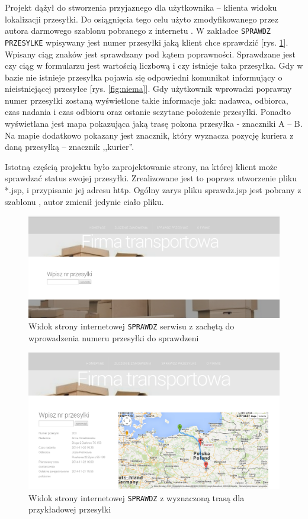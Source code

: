 \documentclass[eng,printmode,oneside]{mgr}
\begin{document}
Projekt dążył do stworzenia przyjaznego dla użytkownika -- klienta widoku
lokalizacji przesyłki. Do osiągnięcia tego celu użyto zmodyfikowanego przez
autora darmowego szablonu pobranego z internetu \cite{szablon}. W zakładce
\texttt{SPRAWDZ PRZESYLKE} wpisywany jest numer przesyłki jaką klient chce
sprawdzić [rys.
\ref{fig:sprawdz}]. Wpisany ciąg znaków jest sprawdzany pod kątem poprawności.
Sprawdzane jest czy ciąg w formularzu jest wartością liczbową i czy istnieje
taka przesyłka. Gdy w bazie nie istnieje przesyłka pojawia się odpowiedni komunikat
informujący o nieistniejącej przesyłce [rys. \ref{fig:niema}]. Gdy użytkownik
wprowadzi poprawny numer przesyłki zostaną wyświetlone takie informacje jak:
nadawca, odbiorca, czas nadania i czas odbioru oraz ostanie sczytane położenie
przesyłki. Ponadto wyświetlana jest mapa pokazująca jaką trasę pokona przesyłka
- znaczniki A -- B. Na mapie dodatkowo pokazany jest znacznik, który wyznacza
pozycję kuriera z daną przesyłką -- znacznik ,,kurier''.

Istotną częścią projektu było zaprojektowanie strony, na której
klient może sprawdzać status swojej przesyłki. Zrealizowane jest to poprzez
utworzenie pliku *.jsp, i przypisanie jej adresu http. Ogólny zarys pliku sprawdz.jsp jest
pobrany z szablonu \cite{szablon}, autor zmienił jedynie ciało pliku. 

\begin{figure}[ht!]
\centering
\includegraphics[width=\textwidth]{sprawdz.png}
\caption{Widok strony internetowej \texttt{SPRAWDZ} serwisu z zachętą do
wprowadzenia numeru przesyłki do sprawdzeni}
\label{fig:sprawdz}
\end{figure}

\begin{figure}[ht!]
\centering
\includegraphics[width=\textwidth]{przyklad.png}
\caption{Widok strony internetowej \texttt{SPRAWDZ} z wyznaczoną trasą dla
przykładowej przesylki}
\label{fig:pokaz}
\end{figure}
\end{document}
